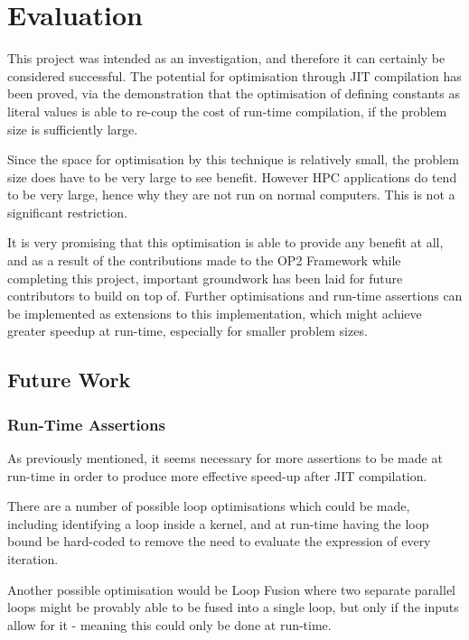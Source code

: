 
\section{Evaluation}
\label{s:eval}

This project was intended as an investigation, and therefore it can certainly be considered successful. The potential for optimisation through JIT compilation has been proved, via the demonstration that the optimisation of defining constants as literal values is able to re-coup the cost of run-time compilation, if the problem size is sufficiently large.
\par
Since the space for optimisation by this technique is relatively small, the problem size does have to be very large to see benefit. However HPC applications do tend to be very large, hence why they are not run on normal computers. This is not a significant restriction.
\par
It is very promising that this optimisation is able to provide any benefit at all, and as a result of the contributions made to the OP2 Framework while completing this project, important groundwork has been laid for future contributors to build on top of. Further optimisations and run-time assertions can be implemented as extensions to this implementation, which might achieve greater speedup at run-time, especially for smaller problem sizes.

\subsection{Future Work}
\label{ss:fw}

\subsubsection{Run-Time Assertions}
As previously mentioned, it seems necessary for more assertions to be made at run-time in order to produce more effective speed-up after JIT compilation. \par
There are a number of possible loop optimisations which could be made, including identifying a loop inside a kernel, and at run-time having the loop bound be hard-coded to remove the need to evaluate the expression of every iteration.
\par Another possible optimisation would be Loop Fusion where two separate parallel loops might be provably able to be fused into a single loop, but only if the inputs allow for it - meaning this could only be done at run-time.

